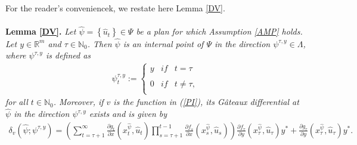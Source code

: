 \documentclass[3p]{elsarticle}
\newcommand{\rzm}{\mathbb R^{m}}
\newcommand{\nat}{\mathbb N_0}
\begin{document}
	For the reader's conveniencek, we restate here Lemma \ref{DV}.
	\\\\
	\textbf{Lemma \ref{DV}.}
	\textit{Let  $\hat \psi=\left\lbrace \hat u_t\right\rbrace \in \Psi$ be a plan for which Assumption \ref{AMP} holds. Let $y\in\rzm$ and $\tau\in\nat$. Then $\hat\psi$ is an internal point of $\Psi$ in the direction $\psi^{\tau,y}\in\Lambda$, where $\psi^{\tau,y}$ is defined as 
		\begin{align*}
		\psi^{\tau,y}_t:=\left\{ \begin{array}{lcc}
		\displaystyle y &   if  & t=\tau \\
		\\ 0 &  if & t\neq\tau, \\
		\end{array}
		\right.
		\end{align*}
		for all $t\in\nat$. Moreover, if $v$ is the function in (\ref{PI}), its G\^ ateaux differential at $\hat\psi$ in the direction $\psi^{\tau,y}$ exists and is given by 
		\begin{align*}
		\delta_v(\hat\psi;\psi^{\tau,y})= \left( \sum_{t=\tau+1}^\infty\frac{\partial g_t}{\partial x}(x_t^{\hat{\psi}},\hat u_t)\prod_{s=\tau+1}^{t-1}\frac{\partial f_s}{\partial x}(x_s^{\hat{\psi}},\hat u_s)\right)\frac{\partial f_\tau}{\partial y}(x_\tau^{\hat{\psi}},\hat u_\tau)y^*+\frac{\partial g_\tau}{\partial y}(x_\tau^{\hat{\psi}},\hat u_\tau)y^*.
		\end{align*} }
	
\end{document}
